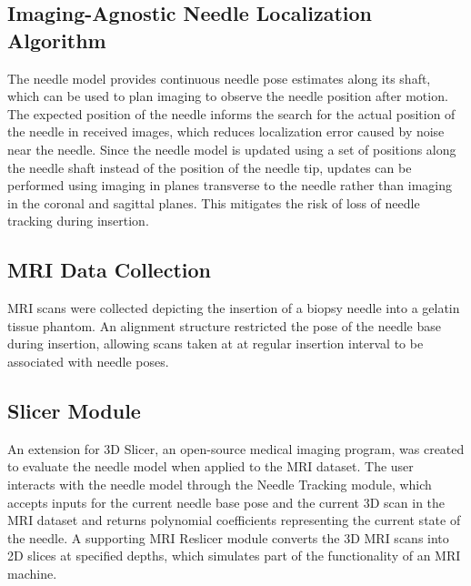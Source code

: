 \subsection{Imaging-Agnostic Needle Localization Algorithm}
The needle model provides continuous needle pose estimates along its shaft, which can be used to plan imaging to observe the needle position after motion. The expected position of the needle informs the search for the actual position of the needle in received images, which reduces localization error caused by noise near the needle. Since the needle model is updated using a set of positions along the needle shaft instead of the position of the needle tip, updates can be performed using imaging in planes transverse to the needle rather than imaging in the coronal and sagittal planes. This mitigates the risk of loss of needle tracking during insertion.

\subsection{MRI Data Collection}
MRI scans were collected depicting the insertion of a biopsy needle into a gelatin tissue phantom. An alignment structure restricted the pose of the needle base during insertion, allowing scans taken at at regular insertion interval to be associated with needle poses.

\subsection{Slicer Module}
An extension for 3D Slicer, an open-source medical imaging program\cite{_3d_, fedorov_3d_2012}, was created to evaluate the needle model when applied to the MRI dataset. The user interacts with the needle model through the Needle Tracking module, which accepts inputs for the current needle base pose and the current 3D scan in the MRI dataset and returns polynomial coefficients representing the current state of the needle. A supporting MRI Reslicer module converts the 3D MRI scans into 2D slices at specified depths, which simulates part of the functionality of an MRI machine.



